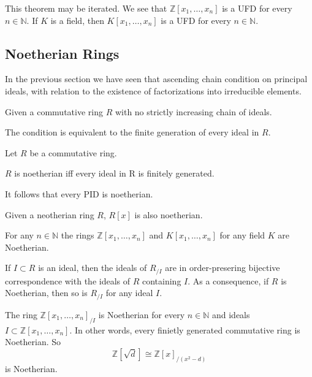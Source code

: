 \begin{remark}
   This theorem may be iterated.
   We see that \(\mathbb{Z}[x_1, \ldots, x_n]\) is a UFD for every \(n \in \mathbb{N}\).
   If \(K\) is a field, then \(K[x_1, \ldots, x_n]\) is a UFD for every \(n \in \mathbb{N}\).
\end{remark}

\subsection{Noetherian Rings}
In the previous section we have seen that ascending chain condition on principal ideals, with relation to the existence of factorizations into irreducible elements.
\begin{definition}
   Given a commutative ring \(R\) with no strictly increasing chain of ideals.
\end{definition}
\begin{remark}
   The condition is equivalent to the finite generation of every ideal in \(R\).
\end{remark}

\begin{proposition}
   Let \(R\) be a commutative ring.

   \(R\) is noetherian iff every ideal in R is finitely generated.
\end{proposition}
\begin{remark}
   It follows that every PID is noetherian.
\end{remark}

\begin{theorem}
   Given a neotherian ring \(R\), \(R[x]\) is also noetherian.
\end{theorem}
\begin{example}
   For any \(n \in \mathbb{N}\) the rings \(\mathbb{Z}[x_1, \ldots, x_n]\) and \(K[x_1, \ldots, x_n]\) for any field \(K\) are Noetherian.
\end{example}

If \(I \subset R\) is an ideal, then the ideals of \(R_{/I}\) are in order-presering bijective correspondence with the ideals of \(R\) containing \(I\).
As a consequence, if \(R\) is Noetherian, then so is \(R_{/I}\) for any ideal \(I\).
\begin{example}
   The ring \(\mathbb{Z}[x_1, \ldots, x_n]_{/I}\) is Noetherian for every \(n \in \mathbb{N}\) and ideals \(I \subset \mathbb{Z}[x_1, \ldots, x_n]\).
   In other words, every finietly generated commutative ring is Noetherian.
   So
   \[\mathbb{Z}[\sqrt{d}] \cong \mathbb{Z}[x]_{/(x^2 - d)}\]
   is Noetherian.
\end{example}

